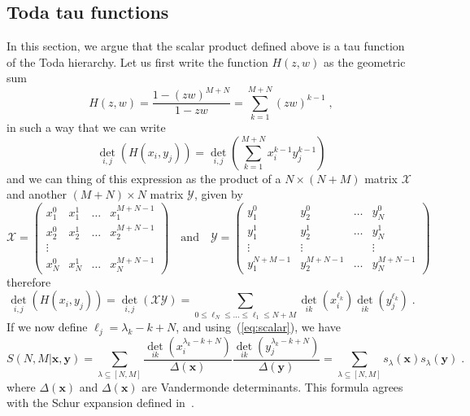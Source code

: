 \documentclass[a4paper,11pt]{amsart}
\begin{document}
\subsection{Toda tau functions}
In this section, we argue that the scalar product defined above is a tau function 
of the Toda hierarchy. Let us first write the function \(H(z,w)\) as the geometric sum 
\begin{equation}
  H(z,w) = \frac{1 - (zw)^{M+N}}{1 - zw} = \sum_{k=1}^{M+N} (zw)^{k-1} \; , 
\end{equation}
in such a way that 
we can write
\begin{equation}
  \det_{i,j} \left(H(x_i, y_j)\right) = \det_{i,j} \left( \sum_{k=1}^{M+N} x_i^{k-1} y_j^{k-1}\right)
\end{equation}
and we can thing of this expression as the product of a \(N\times (N+M)\) matrix \(\mathcal{X}\)
and another \((M + N)\times N\) matrix \(\mathcal{Y}\), given by
\begin{equation}
  \mathcal{X} = 
  \begin{pmatrix}
  x_1^0 & x_1^1 & \dots & x_1^{M+N-1} \\  
  x_2^0 & x_2^1 & \dots & x_2^{M+N-1} \\  
  \vdots \\
  x_N^0 & x_N^1 & \dots & x_N^{M+N-1} 
  \end{pmatrix}\quad \textrm{and} \quad 
  \mathcal{Y} = 
  \begin{pmatrix}
  y_1^0 & y_2^0 & \dots & y_N^0 \\  
  y_1^1 & y_2^1 & \dots & y_N^1 \\  
  \vdots & \vdots & & \vdots \\
  y_1^{N+M-1} & y_2^{M+N-1} & \dots & y_N^{M+N-1} 
  \end{pmatrix}
\end{equation}
therefore 
\begin{equation}
  \det_{i,j} \left(H(x_i, y_j)\right) =  \det_{i,j} \left( \mathcal{X}\mathcal{Y}\right)
= \sum_{0 \leq \ell_{N} \leq \dots \leq \ell_1\leq N+M }  \det_{ik}(x_i^{\ell_k})  \det_{ik}(y_j^{\ell_k})\; .
\end{equation}
If we now define \(\ell_j = \lambda_k - k + N\), and
using~(\ref{eq:scalar}), we have
\begin{equation}
S(N, M|\bm{x}, \bm{y}) = \sum_{\lambda\subseteq [N,M]}
\frac{\det_{ik}(x_i^{\lambda_k - k + N})}{\Delta(\bm{x})} \frac{ \det_{ik}(y_j^{\lambda_k - k + N})}{\Delta(\bm{y})}
= \sum_{\lambda\subseteq [N,M]} s_\lambda(\bm{x}) s_\lambda(\bm{y}) \; .
\end{equation}
where \(\Delta(\bm{x})\) and \(\Delta(\bm{x})\) are Vandermonde
determinants. This formula agrees with the Schur expansion defined
in~\cite{Bogoliubov2005}.
\end{document}
